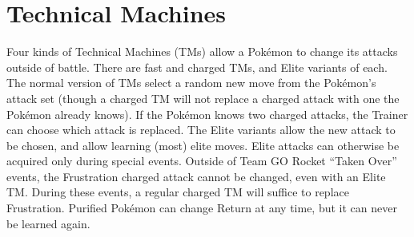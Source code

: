 



\section{Technical Machines\label{sec:tms}}
Four kinds of Technical Machines (TMs) allow a Pokémon to change its attacks outside of battle.
There are fast and charged TMs, and Elite variants of each.
The normal version of TMs select a random new move from the Pokémon's attack set (though a charged TM will not replace
 a charged attack with one the Pokémon already knows).
If the Pokémon knows two charged attacks, the Trainer can choose which attack is replaced.
The Elite variants allow the new attack to be chosen, and allow learning (most) elite moves.
Elite attacks can otherwise be acquired only during special events.
Outside of Team GO Rocket ``Taken Over'' events, the Frustration charged attack cannot be
 changed, even with an Elite TM.
During these events, a regular charged TM will suffice to replace Frustration.
Purified Pokémon can change Return at any time, but it can never be learned again.

